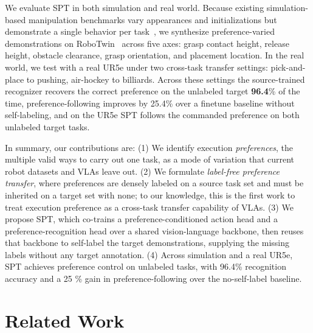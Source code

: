 \documentclass{article}
\begin{document}
We evaluate SPT in both simulation and real world. Because existing simulation-based manipulation benchmarks vary appearances and initializations but demonstrate a single behavior per task~\citep{libero, liberoplus}, we synthesize preference-varied demonstrations on RoboTwin~\citep{robotwin} across five axes: grasp contact height, release height, obstacle clearance, grasp orientation, and placement location. In the real world, we test with a real UR5e under two cross-task transfer settings: pick-and-place to pushing, air-hockey to billiards.
Across these settings the source-trained recognizer recovers the correct preference on the unlabeled target \textbf{96.4}\% of the time, preference-following improves by 25.4\% over a finetune baseline without self-labeling, and on the UR5e SPT follows the commanded preference on both unlabeled target tasks.

In summary, our contributions are:
(1) We identify execution \emph{preferences}, the multiple valid ways to carry out one task, as a mode of variation that current robot datasets and VLAs leave out.
(2) We formulate \emph{label-free preference transfer}, where preferences are densely labeled on a source task set and must be inherited on a target set with none; to our knowledge, this is the first work to treat execution preference as a cross-task transfer capability of VLAs.
(3) We propose SPT, which co-trains a preference-conditioned action head and a preference-recognition head over a shared vision-language backbone, then reuses that backbone to self-label the target demonstrations, supplying the missing labels without any target annotation.
(4) Across simulation and a real UR5e, SPT achieves preference control on unlabeled tasks, with 96.4\% recognition accuracy and a 25 \% gain in preference-following over the no-self-label baseline.







\section{Related Work}
\label{sec:related}
\end{document}
